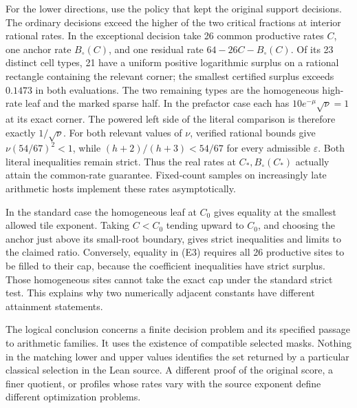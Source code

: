 For the lower directions, use the policy that kept the original support decisions. The ordinary decisions exceed the higher of the two critical fractions at interior rational rates. In the exceptional decision take 26 common productive rates \(C\), one anchor rate \(B_{\circ}(C)\), and one residual rate \(64-26C-B_{\circ}(C)\). Of its 23 distinct cell types, 21 have a uniform positive logarithmic surplus on a rational rectangle containing the relevant corner; the smallest certified surplus exceeds \(0.1473\) in both evaluations. The two remaining types are the homogeneous high-rate leaf and the marked sparse half. In the prefactor case each has \(10e^{-\mu}\sqrt\nu=1\) at its exact corner. The powered left side of the literal comparison is therefore exactly \(1/\sqrt\nu\). For both relevant values of \(\nu\), verified rational bounds give \(\nu(54/67)^2<1\), while \((h+2)/(h+3)<54/67\) for every admissible \(\varepsilon\). Both literal inequalities remain strict. Thus the real rates at \(C_*,B_{\circ}(C_*)\) actually attain the common-rate guarantee. Fixed-count samples on increasingly late arithmetic hosts implement these rates asymptotically.

In the standard case the homogeneous leaf at \(C_0\) gives equality at the smallest allowed tile exponent. Taking \(C<C_0\) tending upward to \(C_0\), and choosing the anchor just above its small-root boundary, gives strict inequalities and limits to the claimed ratio. Conversely, equality in (E3) requires all 26 productive sites to be filled to their cap, because the coefficient inequalities have strict surplus. Those homogeneous sites cannot take the exact cap under the standard strict test. This explains why two numerically adjacent constants have different attainment statements.

The logical conclusion concerns a finite decision problem and its specified passage to arithmetic families. It uses the existence of compatible selected masks. Nothing in the matching lower and upper values identifies the set returned by a particular classical selection in the Lean source. A different proof of the original score, a finer quotient, or profiles whose rates vary with the source exponent define different optimization problems.

